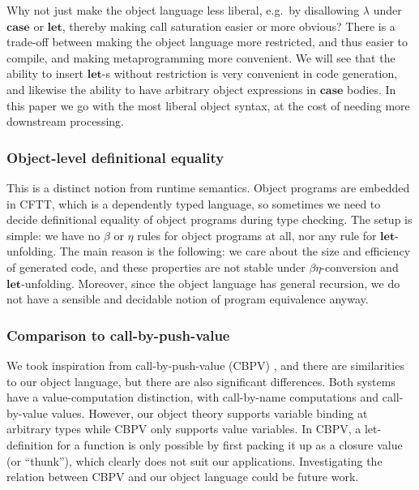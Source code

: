 \documentclass[acmsmall,screen]{acmart}
\newcommand{\mbf}[1]{{\mathbf{#1}}}
\theoremstyle{remark}
\begin{document}
Why not just make the object language less liberal, e.g.\ by disallowing
$\lambda$ under $\mbf{case}$ or $\mbf{let}$, thereby making call saturation
easier or more obvious? There is a trade-off between making the object language
more restricted, and thus easier to compile, and making metaprogramming more
convenient. We will see that the ability to insert $\mbf{let}$-s without
restriction is very convenient in code generation, and likewise the ability to
have arbitrary object expressions in $\mbf{case}$ bodies. In this paper we go
with the most liberal object syntax, at the cost of needing more downstream
processing.


\subsubsection{Object-level definitional equality} This is a distinct notion
from runtime semantics. Object programs are embedded in CFTT, which is a
dependently typed language, so sometimes we need to decide definitional equality of
object programs during type checking. The setup is simple: we have no $\beta$ or
$\eta$ rules for object programs at all, nor any rule for $\mbf{let}$-unfolding.
The main reason is the following: we care about the size and efficiency of
generated code, and these properties are not stable under $\beta\eta$-conversion
and $\mbf{let}$-unfolding. Moreover, since the object language has general
recursion, we do not have a sensible and decidable notion of program equivalence
anyway.

\subsubsection{Comparison to call-by-push-value}
We took inspiration from call-by-push-value (CBPV) \cite{DBLP:conf/tlca/Levy99},
and there are similarities to our object language, but there are also
significant differences. Both systems have a value-computation distinction, with
call-by-name computations and call-by-value values. However, our object theory
supports variable binding at arbitrary types while CBPV only supports value
variables. In CBPV, a let-definition for a function is only possible by first
packing it up as a closure value (or ``thunk''), which clearly does not suit our
applications.  Investigating the relation between CBPV and our object language
could be future work.
\end{document}
